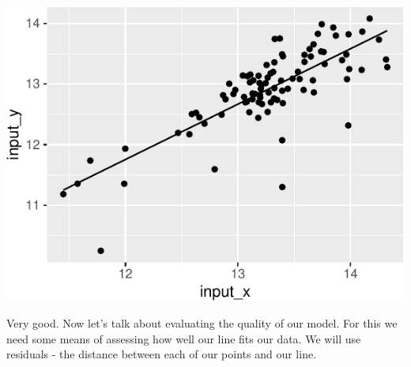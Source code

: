 \documentclass[
]{krantz}
\newenvironment{Shaded}{\begin{snugshade}}{\end{snugshade}}
\newcommand{\AttributeTok}[1]{\textcolor[rgb]{0.77,0.63,0.00}{#1}}
\newcommand{\FunctionTok}[1]{\textcolor[rgb]{0.00,0.00,0.00}{#1}}
\newcommand{\NormalTok}[1]{#1}
\newcommand{\SpecialCharTok}[1]{\textcolor[rgb]{0.00,0.00,0.00}{#1}}
\begin{document}
\begin{center}\includegraphics{index_files/figure-latex/unnamed-chunk-123-1} \end{center}

Very good. Now let's talk about evaluating the quality of our model. For this we need some means of assessing how well our line fits our data. We will use residuals - the distance between each of our points and our line.

\begin{Shaded}
\end{Shaded}
\end{document}
